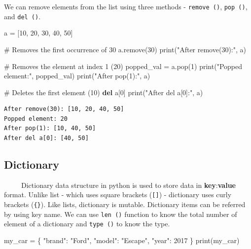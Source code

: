 \documentclass[
  letterpaper,
  DIV=11,
  numbers=noendperiod]{scrreprt}
\newenvironment{Shaded}{\begin{snugshade}}{\end{snugshade}}
\newcommand{\BuiltInTok}[1]{\textcolor[rgb]{0.00,0.23,0.31}{#1}}
\newcommand{\CommentTok}[1]{\textcolor[rgb]{0.37,0.37,0.37}{#1}}
\newcommand{\DecValTok}[1]{\textcolor[rgb]{0.68,0.00,0.00}{#1}}
\newcommand{\KeywordTok}[1]{\textcolor[rgb]{0.00,0.23,0.31}{\textbf{#1}}}
\newcommand{\NormalTok}[1]{\textcolor[rgb]{0.00,0.23,0.31}{#1}}
\newcommand{\OperatorTok}[1]{\textcolor[rgb]{0.37,0.37,0.37}{#1}}
\newcommand{\StringTok}[1]{\textcolor[rgb]{0.13,0.47,0.30}{#1}}
\begin{document}
We can remove elements from the list using three methods -
\texttt{remove\ ()}, \texttt{pop\ ()}, and \texttt{del\ ()}.

\begin{Shaded}
\begin{Highlighting}[]
\NormalTok{a }\OperatorTok{=}\NormalTok{ [}\DecValTok{10}\NormalTok{, }\DecValTok{20}\NormalTok{, }\DecValTok{30}\NormalTok{, }\DecValTok{40}\NormalTok{, }\DecValTok{50}\NormalTok{]}

\CommentTok{\# Removes the first occurrence of 30}
\NormalTok{a.remove(}\DecValTok{30}\NormalTok{)  }
\BuiltInTok{print}\NormalTok{(}\StringTok{"After remove(30):"}\NormalTok{, a)}

\CommentTok{\# Removes the element at index 1 (20)}
\NormalTok{popped\_val }\OperatorTok{=}\NormalTok{ a.pop(}\DecValTok{1}\NormalTok{)  }
\BuiltInTok{print}\NormalTok{(}\StringTok{"Popped element:"}\NormalTok{, popped\_val)}
\BuiltInTok{print}\NormalTok{(}\StringTok{"After pop(1):"}\NormalTok{, a) }

\CommentTok{\# Deletes the first element (10)}
\KeywordTok{del}\NormalTok{ a[}\DecValTok{0}\NormalTok{]  }
\BuiltInTok{print}\NormalTok{(}\StringTok{"After del a[0]:"}\NormalTok{, a)}
\end{Highlighting}
\end{Shaded}

\begin{verbatim}
After remove(30): [10, 20, 40, 50]
Popped element: 20
After pop(1): [10, 40, 50]
After del a[0]: [40, 50]
\end{verbatim}

\subsection{Dictionary}\label{dictionary}

~~~~~Dictionary data structure in python is used to store data in
\textbf{key}:\textbf{value} format. Unlike list - which uses square
brackets (\texttt{{[}{]}}) - dictionary uses curly brackets
(\texttt{\{\}}). Like lists, dictionary is mutable. Dictionary items can
be referred by using key name. We can use \texttt{len\ ()} function to
know the total number of element of a dictionary and \texttt{type\ ()}
to know the type.

\begin{Shaded}
\begin{Highlighting}[]
\NormalTok{my\_car }\OperatorTok{=}\NormalTok{ \{}
  \StringTok{"brand"}\NormalTok{: }\StringTok{"Ford"}\NormalTok{,}
  \StringTok{"model"}\NormalTok{: }\StringTok{"Escape"}\NormalTok{,}
  \StringTok{"year"}\NormalTok{: }\DecValTok{2017}
\NormalTok{\}}
\BuiltInTok{print}\NormalTok{(my\_car)}
\end{Highlighting}
\end{Shaded}
\end{document}
